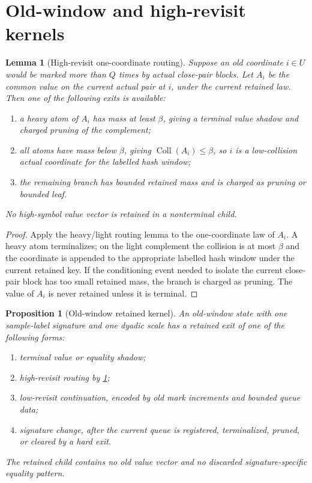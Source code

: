 \documentclass[11pt]{article}
\newcommand{\Cref}[1]{\ref{#1}}
\newtheorem{lemma}[theorem]{Lemma}
\newtheorem{proposition}[theorem]{Proposition}
\theoremstyle{remark}
\newcommand{\Coll}{\operatorname{Coll}}
\begin{document}
\section{Old-window and high-revisit kernels}\label{app:old-window}

\begin{lemma}[High-revisit one-coordinate routing]\label{lem:appendix-high-revisit}
Suppose an old coordinate $i\in U$ would be marked more than $Q$ times by actual close-pair blocks.  Let $A_i$ be the common value on the current actual pair at $i$, under the current retained law.  Then one of the following exits is available:
\begin{enumerate}[label=\textup{(\alph*)}]
\item a heavy atom of $A_i$ has mass at least $\beta$, giving a terminal value shadow and charged pruning of the complement;
\item all atoms have mass below $\beta$, giving $\Coll(A_i)\le \beta$, so $i$ is a low-collision actual coordinate for the labelled hash window;
\item the remaining branch has bounded retained mass and is charged as pruning or bounded leaf.
\end{enumerate}
No high-symbol value vector is retained in a nonterminal child.
\end{lemma}

\begin{proof}
Apply the heavy/light routing lemma to the one-coordinate law of $A_i$.  A heavy atom terminalizes; on the light complement the collision is at most $\beta$ and the coordinate is appended to the appropriate labelled hash window under the current retained key.  If the conditioning event needed to isolate the current close-pair block has too small retained mass, the branch is charged as pruning.  The value of $A_i$ is never retained unless it is terminal.
\end{proof}

\begin{proposition}[Old-window retained kernel]\label{prop:appendix-old-window}
An old-window state with one sample-label signature and one dyadic scale has a retained exit of one of the following forms:
\begin{enumerate}[label=\textup{(\roman*)}]
\item terminal value or equality shadow;
\item high-revisit routing by \Cref{lem:appendix-high-revisit};
\item low-revisit continuation, encoded by old mark increments and bounded queue data;
\item signature change, after the current queue is registered, terminalized, pruned, or cleared by a hard exit.
\end{enumerate}
The retained child contains no old value vector and no discarded signature-specific equality pattern.
\end{proposition}
\end{document}
